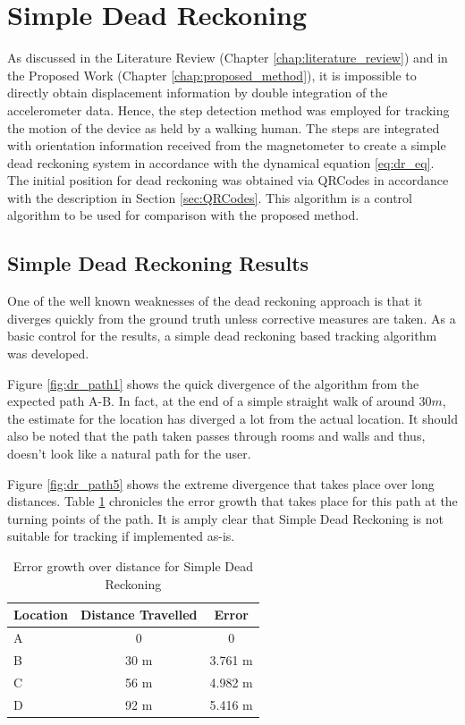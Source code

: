 \section{Simple Dead Reckoning}

As discussed in the Literature Review (Chapter \ref{chap:literature_review}) and
in the Proposed Work (Chapter \ref{chap:proposed_method}), it is impossible to
directly obtain displacement information by double integration of the
accelerometer data. Hence, the step detection method was employed for tracking
the motion of the device as held by a walking human. The steps are integrated
with orientation information received from the magnetometer to create a 
simple dead reckoning system in accordance with the dynamical equation 
\eqref{eq:dr_eq}. The initial position for dead reckoning was obtained via
QRCodes in accordance with the description in Section \ref{sec:QRCodes}.
This algorithm is a control algorithm to be used for comparison with 
the proposed method.

\subsection{Simple Dead Reckoning Results}

One of the well known weaknesses of the dead reckoning approach is that it
diverges quickly from the ground truth unless corrective measures are taken.
As a basic control for the results, a simple dead reckoning based 
tracking algorithm was developed. 

Figure \ref{fig:dr_path1} shows the quick divergence of the algorithm
from the expected path A-B. In fact, at the end of a simple straight walk of 
around $30 m$, the estimate for the location has diverged a lot from the 
actual location. It should also be noted that the path taken passes through
rooms and walls and thus, doesn't look like a natural path for the user.

Figure \ref{fig:dr_path5} shows the extreme divergence that takes place 
over long distances. Table \ref{tbl:dr_error_growth} chronicles the 
error growth that takes place for this path at the turning points of the path.
It is amply clear that Simple Dead Reckoning is not suitable for tracking
if implemented as-is.

\begin{table}[bph]
\centering
\begin{tabular}{l c c}
\hline
\hline
Location    & Distance Travelled    & Error \\
\hline
A           & 0                     & 0 \\
B           & 30 m                  & 3.761 m \\
C           & 56 m                  & 4.982 m \\
D           & 92 m                  & 5.416 m \\
\hline
\end{tabular}
\caption{Error growth over distance for Simple Dead Reckoning\label{tbl:dr_error_growth}}
\end{table}

